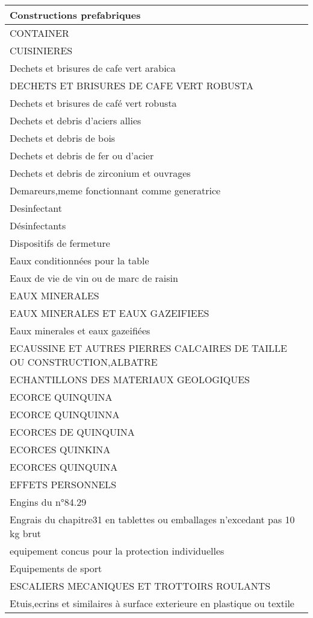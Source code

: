 \documentclass[
]{book}
\begin{document}
\begin{table}
\begin{tabular}[t]{l}
\hline
Constructions prefabriques\\
\hline
CONTAINER\\
\hline
CUISINIERES\\
\hline
Dechets et brisures de cafe vert arabica\\
\hline
DECHETS ET BRISURES DE CAFE VERT ROBUSTA\\
\hline
Dechets et brisures de café vert robusta\\
\hline
Dechets et debris d'aciers allies\\
\hline
Dechets et debris de bois\\
\hline
Dechets et debris de fer ou d'acier\\
\hline
Dechets et debris de zirconium et ouvrages\\
\hline
Demareurs,meme fonctionnant comme generatrice\\
\hline
Desinfectant\\
\hline
Désinfectants\\
\hline
Dispositifs de fermeture\\
\hline
Eaux conditionnées pour la table\\
\hline
Eaux de vie de vin ou de marc de raisin\\
\hline
EAUX MINERALES\\
\hline
EAUX MINERALES ET EAUX GAZEIFIEES\\
\hline
Eaux minerales et eaux gazeifiées\\
\hline
ECAUSSINE ET AUTRES PIERRES CALCAIRES DE TAILLE OU CONSTRUCTION,ALBATRE\\
\hline
ECHANTILLONS DES MATERIAUX GEOLOGIQUES\\
\hline
ECORCE QUINQUINA\\
\hline
ECORCE QUINQUINNA\\
\hline
ECORCES DE QUINQUINA\\
\hline
ECORCES QUINKINA\\
\hline
ECORCES QUINQUINA\\
\hline
EFFETS PERSONNELS\\
\hline
Engins du n°84.29\\
\hline
Engrais du chapitre31 en tablettes ou emballages n'excedant pas 10 kg brut\\
\hline
equipement concus pour la protection individuelles\\
\hline
Equipements de sport\\
\hline
ESCALIERS MECANIQUES ET TROTTOIRS ROULANTS\\
\hline
Etuis,ecrins et similaires à surface exterieure en plastique ou textile\\

\end{tabular}
\end{table}
\end{document}
